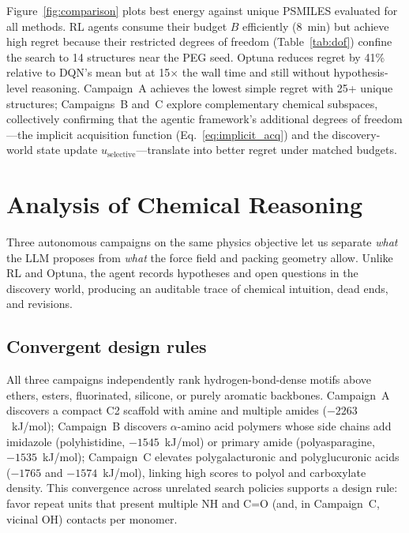 \documentclass[twocolumn]{fairmeta}
\begin{document}
Figure~\ref{fig:comparison} plots best energy against unique PSMILES evaluated for all methods.
RL agents consume their budget $B$ efficiently (8~min) but achieve high regret because their restricted degrees of freedom (Table~\ref{tab:dof}) confine the search to 14 structures near the PEG seed.
Optuna reduces regret by 41\% relative to DQN's mean but at 15$\times$ the wall time and still without hypothesis-level reasoning.
Campaign~A achieves the lowest simple regret with 25+ unique structures; Campaigns~B and~C explore complementary chemical subspaces, collectively confirming that the agentic framework's additional degrees of freedom---the implicit acquisition function (Eq.~\ref{eq:implicit_acq}) and the discovery-world state update $u_\text{selective}$---translate into better regret under matched budgets.

\section{Analysis of Chemical Reasoning}
\label{sec:analysis}

Three autonomous campaigns on the same physics objective let us separate \emph{what} the LLM proposes from \emph{what} the force field and packing geometry allow.
Unlike RL and Optuna, the agent records hypotheses and open questions in the discovery world, producing an auditable trace of chemical intuition, dead ends, and revisions.

\subsection{Convergent design rules}

All three campaigns independently rank hydrogen-bond-dense motifs above ethers, esters, fluorinated, silicone, or purely aromatic backbones.
Campaign~A discovers a compact C2 scaffold with amine and multiple amides ($-2263$~kJ/mol); Campaign~B discovers $\alpha$-amino acid polymers whose side chains add imidazole (polyhistidine, $-1545$~kJ/mol) or primary amide (polyasparagine, $-1535$~kJ/mol); Campaign~C elevates polygalacturonic and polyglucuronic acids ($-1765$ and $-1574$~kJ/mol), linking high scores to polyol and carboxylate density.
This convergence across unrelated search policies supports a design rule: favor repeat units that present multiple NH and C=O (and, in Campaign~C, vicinal OH) contacts per monomer.
\end{document}
